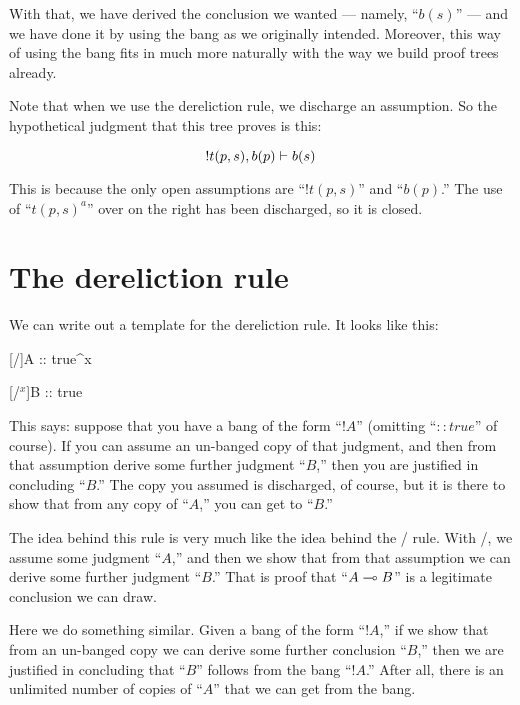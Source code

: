 \documentclass[../../../main.tex]{subfiles}
\begin{document}
\noindent
With that, we have derived the conclusion we wanted --- namely, ``$b(s)$'' --- and we have done it by using the bang as we originally intended. Moreover, this way of using the bang fits in much more naturally with the way we build proof trees already.

Note that when we use the dereliction rule, we discharge an assumption. So the hypothetical judgment that this tree proves is this:

\begin{equation*}
  !t(p, s), b(p) \ndturnstile/ b(s)
\end{equation*}

\noindent
This is because the only open assumptions are ``$!t(p, s)$'' and ``$b(p)$.'' The use of ``$t(p, s)^{a}$'' over on the right has been discharged, so it is closed.


\section{The dereliction rule}

We can write out a template for the dereliction rule. It looks like this:

\begin{prooftree*}
  \hypo{}
  
  \hypo{}
  [\startrule/]{A :: true^{x}}
  
  [\bangDer/$^{x}$]{B :: true}
\end{prooftree*}

\noindent
This says: suppose that you have a bang of the form ``$!A$'' (omitting ``$:: true$'' of course). If you can assume an un-banged copy of that judgment, and then from that assumption derive some further judgment ``$B$,'' then you are justified in concluding ``$B$.'' The copy you assumed is discharged, of course, but it is there to show that from any copy of ``$A$,'' you can get to ``$B$.''

The idea behind this rule is very much like the idea behind the \lolliIntro/ rule. With \lolliIntro/, we assume some judgment ``$A$,'' and then we show that from that assumption we can derive some further judgment ``$B$.'' That is proof that ``$A \lolli/ B$'' is a legitimate conclusion we can draw. 

Here we do something similar. Given a bang of the form ``$!A$,'' if we show that from an un-banged copy we can derive some further conclusion ``$B$,'' then we are justified in concluding that ``$B$'' follows from the bang ``$!A$.'' After all, there is an unlimited number of copies of ``$A$'' that we can get from the bang.
\end{document}
